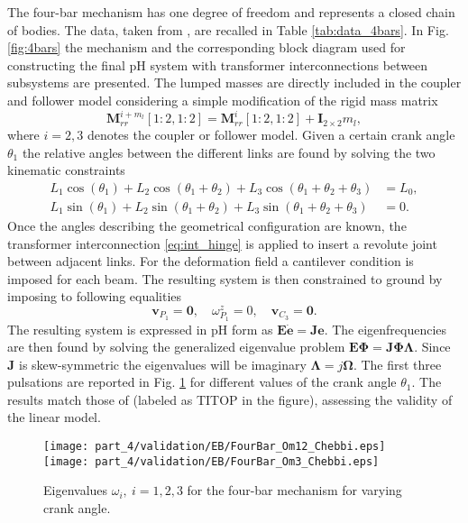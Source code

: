 The four-bar mechanism has one degree of freedom and represents a closed chain of bodies. The data, taken from \cite{kitis1990natural,chebbi2017}, are recalled in Table \ref{tab:data_4bars}. In Fig. \ref{fig:4bars} the mechanism and the corresponding block diagram used for constructing the final pH system with transformer interconnections between subsystems are presented. The lumped masses are directly included in the coupler and follower model considering a simple modification of the rigid mass matrix
\begin{equation*}
\mathbf{M}_{rr}^{i + m_l}[1:2,1:2] = \mathbf{M}_{rr}^{i}[1:2,1:2] + \mathbf{I}_{2\times 2} m_l,
\end{equation*} 
where $i=2,3$ denotes the coupler or follower model. Given a certain crank angle $\theta_1$ the relative angles between the different links are found by solving the two kinematic constraints
\begin{align*}
L_1 \cos(\theta_1)+ L_2 \cos(\theta_1+\theta_2)+ L_3 \cos(\theta_1+\theta_2+\theta_3) &=L_0, \\
L_1 \sin(\theta_1)+L_2 \sin(\theta_1+\theta_2)+L_3 \sin(\theta_1+\theta_2+\theta_3) &=0.
\end{align*} 
Once the angles describing the geometrical configuration are known, the transformer interconnection \eqref{eq:int_hinge} is applied to insert a revolute joint between adjacent links. For the deformation field a cantilever condition is imposed for each beam. The resulting system is then constrained to ground by imposing to following equalities
\begin{equation*}
\mathbf{v}_{P_1} = \mathbf{0}, \quad \omega^z_{P_1} = 0, \quad \mathbf{v}_{C_3} = \mathbf{0}.
\end{equation*}
The resulting system is expressed in pH form as $\mathbf{E}\dot{\mathbf{e}} = \mathbf{J} \mathbf{e}$. The eigenfrequencies are then found by solving the generalized eigenvalue problem $\mathbf{E}\bm{\Phi} = \mathbf{J} \bm{\Phi \Lambda}$. Since $\mathbf{J}$ is skew-symmetric the eigenvalues will be imaginary $\bm{\Lambda} = j \bm{\Omega}$. The first three pulsations  are reported in Fig. \ref{fig:omega_4bars} for different values of the crank angle $\theta_1$. The results match those of \cite{chebbi2017} (labeled as TITOP in the figure), assessing the validity of the linear model.

\begin{figure}[tb]
	\centering
	\texttt{[image: part\_4/validation/EB/FourBar\_Om12\_Chebbi.eps]} 
	\texttt{[image: part\_4/validation/EB/FourBar\_Om3\_Chebbi.eps]} 
	\caption{Eigenvalues $\omega_i, \ i=1,2,3$ for the four-bar mechanism for varying crank angle.}
	\label{fig:omega_4bars}
\end{figure}

